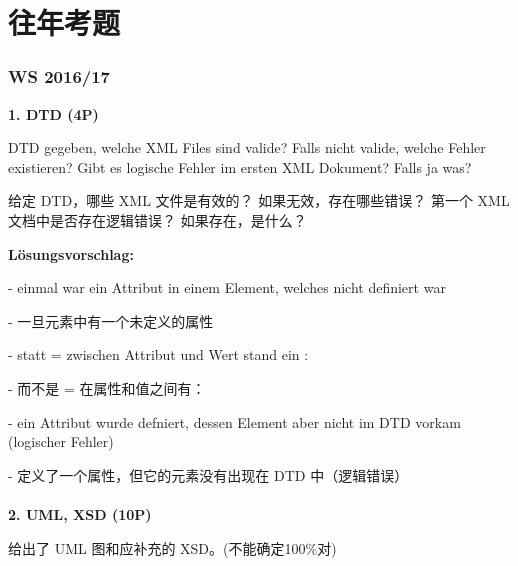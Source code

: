 \documentclass[fontset=windows]{article}
\begin{document}



\part*{往年考题}

\section{WS 2016/17}

\textbf{1. DTD (4P)}

DTD gegeben, welche XML Files sind valide? Falls nicht valide, welche Fehler existieren? Gibt es logische Fehler im ersten XML Dokument? Falls ja was?

给定 DTD，哪些 XML 文件是有效的？ 如果无效，存在哪些错误？ 第一个 XML 文档中是否存在逻辑错误？ 如果存在，是什么？

\noindent\textbf{Lösungsvorschlag: } 

- einmal war ein Attribut in einem Element, welches nicht definiert war

- 一旦元素中有一个未定义的属性

- statt = zwischen Attribut und Wert stand ein :

- 而不是 = 在属性和值之间有：

- ein Attribut wurde defniert, dessen Element aber nicht im DTD vorkam (logischer Fehler)

- 定义了一个属性，但它的元素没有出现在 DTD 中（逻辑错误）
\\
\\
\textbf{2. UML, XSD (10P)}

给出了 UML 图和应补充的 XSD。(不能确定100\%对)
\end{document}
